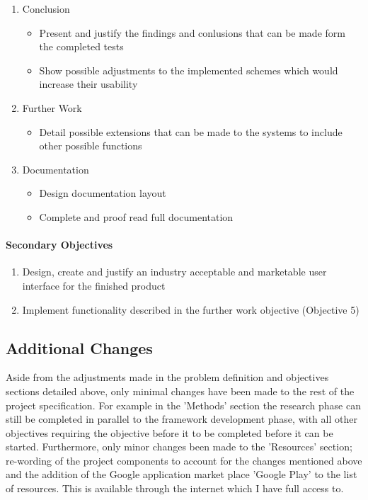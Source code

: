 \documentclass[a4paper,11pt]{article}
\begin{document}
\begin{enumerate}
\begin{itemize}
  \end{itemize}
  \item Conclusion
  \begin{itemize}
    \item Present and justify the findings and conlusions that can be made form the completed tests
    \item Show possible adjustments to the implemented schemes which would increase their usability
  \end{itemize}
  \item Further Work
  \begin{itemize}
    \item Detail possible extensions that can be made to the systems to include other possible functions
  \end{itemize}
  \item Documentation
  \begin{itemize}
    \item Design documentation layout
    \item Complete and proof read full documentation
  \end{itemize}
\end{enumerate}

\paragraph{Secondary Objectives}
\begin{enumerate}
  \item Design, create and justify an industry acceptable and marketable user interface for the finished product
  \item Implement functionality described in the further work objective (Objective 5)
\end{enumerate}

\subsection{Additional Changes}

Aside from the adjustments made in the problem definition and objectives sections detailed above, only minimal changes have been made to the rest of the project specification. For example in the 'Methods' section the research phase can still be completed in parallel to the framework development phase, with all other objectives requiring the objective before it to be completed before it can be started. Furthermore, only minor changes been made to the 'Resources' section; re-wording of the project components to account for the changes mentioned above and the addition of the Google application market place 'Google Play' to the list of resources. This is available through the internet which I have full access to.
\end{document}
